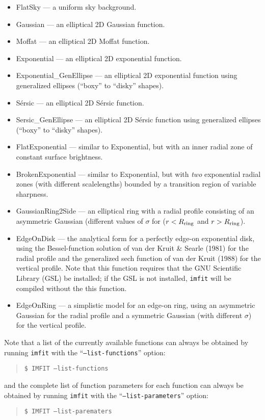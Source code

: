 \documentclass[10pt]{article}
\newcommand{\imfit}{\texttt{imfit}}
\begin{document}
\begin{itemize}
\item FlatSky --- a uniform sky background.
\item Gaussian --- an elliptical 2D Gaussian function.
\item Moffat --- an elliptical 2D Moffat function.
\item Exponential --- an elliptical 2D exponential function.
\item Exponential\_GenEllipse --- an elliptical 2D exponential function using
generalized ellipses (``boxy'' to ``disky'' shapes).
\item S\'ersic --- an elliptical 2D S\'ersic function.
\item Sersic\_GenEllipse --- an elliptical 2D S\'ersic function using
generalized ellipses (``boxy'' to ``disky'' shapes).
\item FlatExponential --- similar to Exponential, but with an inner radial zone
of constant surface brightness.
\item BrokenExponential --- similar to Exponential, but with \textit{two}
exponential radial zones (with different scalelengths) bounded by a transition region
of variable sharpness.
\item GaussianRing2Side --- an elliptical ring with a radial profile
consisting of an asymmetric Gaussian (different values of $\sigma$ for
($r < R_{\rm ring}$ and $r > R_{\rm ring}$).
\item EdgeOnDisk --- the analytical form for a perfectly edge-on exponential
disk, using the Bessel-function solution of van der Kruit \& Searle (1981) for 
the radial profile and the generalized sech function of van der Kruit (1988) 
for the vertical profile. Note that this function requires that the GNU
Scientific Library (GSL) be installed; if the GSL is not installed, \imfit{}
will be compiled without the this function.
\item EdgeOnRing --- a simplistic model for an edge-on ring, using an
asymmetric Gaussian for the radial profile and a symmetric Gaussian (with
different $\sigma$) for the vertical profile.


\end{itemize}

Note that a list of the currently available functions can always be obtained
by running \imfit{} with the ``\texttt{--list-functions}'' option:
\begin{quote}
  \texttt{\$ IMFIT --list-functions}
\end{quote}
and the complete list of function parameters for each function can always be
obtained by running \imfit{} with the ``\texttt{--list-parameters}'' option:
\begin{quote}
  \texttt{\$ IMFIT --list-parematers}
\end{quote}
\end{document}
